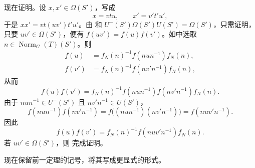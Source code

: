 现在证明。设 \(x,x'\in\Omega(S')\)，写成
\[
  x=vtu,\qquad x'=v't'u',
\]
于是 \(xx'=vt(uv')t'u'\)。由 和 \(U^-(S')\Omega(S')U(S')=\Omega(S')\)，只需证明，只要 \(uv'\in\Omega(S')\)，便有 \(f(uv')=f(u)f(v')\)。如中选取 \(n\in\operatorname{Norm}_G(T)(S')\)。则
\[
\begin{aligned}
 f(u)&=f_N(n)^{-1}f(nun^{-1})f_N(n),\\
 f(v')&=f_N(n)^{-1}f(nv'n^{-1})f_N(n),
\end{aligned}
\]
从而
\[
 f(u)f(v')=f_N(n)^{-1}f(nun^{-1})f(nv'n^{-1})f_N(n).
\]
由于 \(nun^{-1}\in U^-(S')\) 且 \(nv'n^{-1}\in U(S')\)，
\[
 f(nun^{-1})f(nv'n^{-1})
   =f\bigl((nun^{-1})(nv'n^{-1})\bigr)
   =f(nuv'n^{-1}).
\]
因此
\[
  f(u)f(v')=f_N(n)^{-1}f(nuv'n^{-1})f_N(n).
\]
若 \(uv'\in\Omega(S')\)，则 完成证明。


现在保留前一定理的记号，将其写成更显式的形式。

